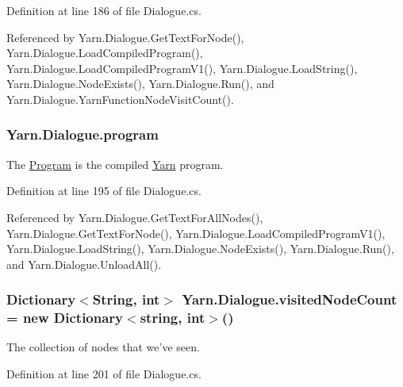 Definition at line 186 of file Dialogue.\-cs.



Referenced by Yarn.\-Dialogue.\-Get\-Text\-For\-Node(), Yarn.\-Dialogue.\-Load\-Compiled\-Program(), Yarn.\-Dialogue.\-Load\-Compiled\-Program\-V1(), Yarn.\-Dialogue.\-Load\-String(), Yarn.\-Dialogue.\-Node\-Exists(), Yarn.\-Dialogue.\-Run(), and Yarn.\-Dialogue.\-Yarn\-Function\-Node\-Visit\-Count().

\hypertarget{a00086_a0a1cca92325f430425d784d416cb5c2b}{
\subsubsection[{program}]{ Yarn.\-Dialogue.\-program\hspace{0.3cm}{\ttfamily [package]}}}\label{a00086_a0a1cca92325f430425d784d416cb5c2b}


The \hyperlink{a00146}{Program} is the compiled \hyperlink{a00045}{Yarn} program. 



Definition at line 195 of file Dialogue.\-cs.



Referenced by Yarn.\-Dialogue.\-Get\-Text\-For\-All\-Nodes(), Yarn.\-Dialogue.\-Get\-Text\-For\-Node(), Yarn.\-Dialogue.\-Load\-Compiled\-Program\-V1(), Yarn.\-Dialogue.\-Load\-String(), Yarn.\-Dialogue.\-Node\-Exists(), Yarn.\-Dialogue.\-Run(), and Yarn.\-Dialogue.\-Unload\-All().

\hypertarget{a00086_aae9e64354066a1e2fa130629959d772b}{
\subsubsection[{visited\-Node\-Count}]{\setlength{\rightskip}{0pt plus 5cm}Dictionary$<${\bf String}, int$>$ Yarn.\-Dialogue.\-visited\-Node\-Count = new Dictionary$<$string, int$>$()}}\label{a00086_aae9e64354066a1e2fa130629959d772b}


The collection of nodes that we've seen. 



Definition at line 201 of file Dialogue.\-cs.



